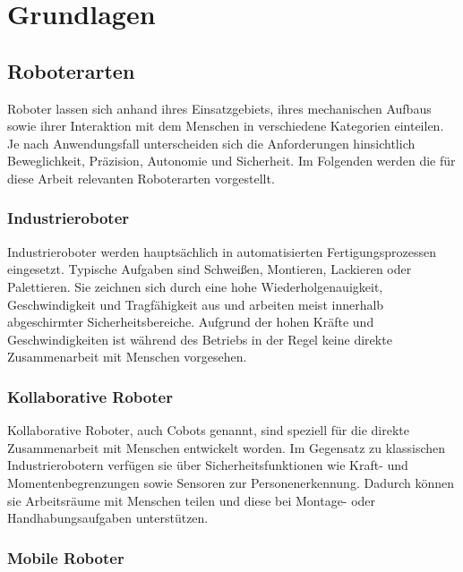 \chapter{Grundlagen}
\label{cha:Grundlagen}




\section{Roboterarten}
\label{sec:Roboterarten}

Roboter lassen sich anhand ihres Einsatzgebiets, ihres mechanischen Aufbaus sowie ihrer Interaktion mit dem Menschen in verschiedene Kategorien einteilen. \cite{Siciliano2016} Je nach Anwendungsfall unterscheiden sich die Anforderungen hinsichtlich Beweglichkeit, Präzision, Autonomie und Sicherheit. Im Folgenden werden die für diese Arbeit relevanten Roboterarten vorgestellt. \cite{Siciliano2016} 

\subsection{Industrieroboter}

Industrieroboter werden hauptsächlich in automatisierten Fertigungsprozessen eingesetzt. Typische Aufgaben sind Schweißen, Montieren, Lackieren oder Palettieren. Sie zeichnen sich durch eine hohe Wiederholgenauigkeit, Geschwindigkeit und Tragfähigkeit aus und arbeiten meist innerhalb abgeschirmter Sicherheitsbereiche. Aufgrund der hohen Kräfte und Geschwindigkeiten ist während des Betriebs in der Regel keine direkte Zusammenarbeit mit Menschen vorgesehen. \cite{iso10218}\cite{Siciliano2016} 

\subsection{Kollaborative Roboter}

Kollaborative Roboter, auch Cobots genannt, sind speziell für die direkte Zusammenarbeit mit Menschen entwickelt worden. Im Gegensatz zu klassischen Industrierobotern verfügen sie über Sicherheitsfunktionen wie Kraft- und Momentenbegrenzungen sowie Sensoren zur Personenerkennung. Dadurch können sie Arbeitsräume mit Menschen teilen und diese bei Montage- oder Handhabungsaufgaben unterstützen. \cite{iso15066}\cite{Siciliano2016} 

\subsection{Mobile Roboter}

